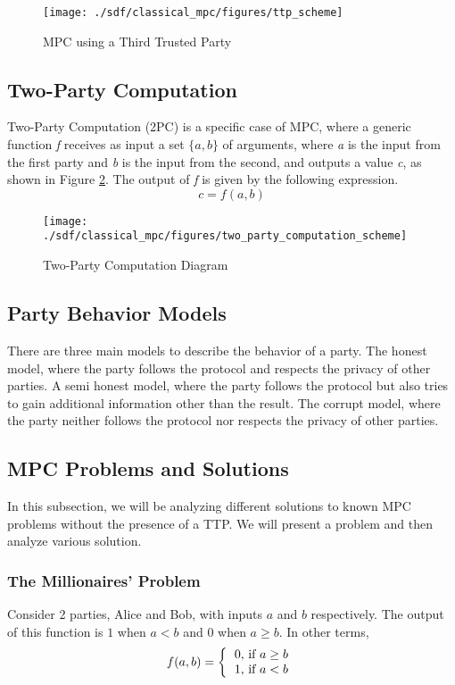 \begin{refsection}
\renewcommand{\figurename}{Figure}
\begin{figure}[H]
\centering
\texttt{[image: ./sdf/classical\_mpc/figures/ttp\_scheme]}
\caption{MPC using a Third Trusted Party}
\label{fig:ttpscheme}
\end{figure}

\subsection{Two-Party Computation}
Two-Party Computation (2PC) is a specific case of MPC, where a generic function \textit{f} receives as input a set $\{a,b\}$
of arguments, where \textit{a} is the input from the first party and \textit{b} is the input from the second,
and outputs a value \textit{c}, as shown in Figure \ref{fig:tpcscheme}.
The output of \textit{f} is given by the following expression.
\begin{equation}\label{eq:tpc}
c = f(a,b)
\end{equation}

\renewcommand{\figurename}{Figure}
\begin{figure}[H]
\centering
\texttt{[image: ./sdf/classical\_mpc/figures/two\_party\_computation\_scheme]}
\caption{Two-Party Computation Diagram}
\label{fig:tpcscheme}
\end{figure}

\subsection{Party Behavior Models}
There are three main models to describe the behavior of a party. The honest model, where the party follows the protocol and respects the privacy of other parties. A semi honest model, where the party follows the protocol but also tries to gain additional information other than the result. The corrupt model, where the party neither follows the protocol nor respects the privacy of other parties.

\pagebreak

\subsection{MPC Problems and Solutions}\label{mpcproblemsandsolutions}
In this subsection, we will be analyzing different solutions to known MPC problems without the presence of a TTP. We will present a problem and then analyze various solution.

\subsubsection{The Millionaires' Problem}
Consider 2 parties, Alice and Bob, with inputs $a$ and $b$ respectively. The output of this function is $1$ when $a < b$
and $0$ when $a \geq b$. In other terms,
\[
f(a,b) = \left \{
          \begin{tabular}{ccc}
          0, if $a \geq b$ \\
          1, if $a < b$
          \end{tabular}
        \right.
\]

\end{refsection}
